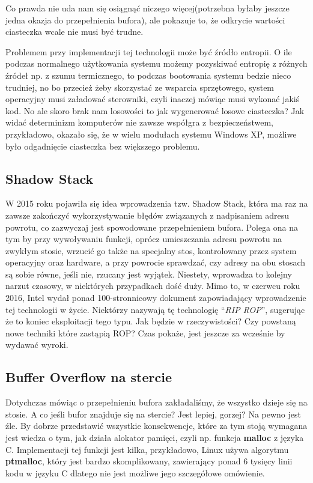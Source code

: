 \documentclass[polish]{kbk}
\begin{document}
Co prawda nie uda nam się osiągnąć niczego więcej(potrzebna byłaby jeszcze 
jedna okazja do przepełnienia bufora), ale pokazuje to, że odkrycie wartości 
ciasteczka wcale nie musi być trudne. 
\par
Problemem przy implementacji tej technologii może być źródło entropii. 
O ile podczas normalnego użytkowania systemu możemy pozyskiwać entropię z różnych 
źródeł np. z szumu termicznego, to podczas bootowania systemu bedzie nieco 
trudniej, no bo przecież żeby skorzystać ze wsparcia sprzętowego, system 
operacyjny musi załadować sterowniki, czyli inaczej mówiąc musi wykonać jakiś kod. 
No ale skoro brak nam losowości to jak wygenerować losowe ciasteczka? Jak widać 
determinizm komputerów nie zawsze współgra z bezpieczeństwem, przykładowo, okazało 
się, że w wielu modułach systemu Windows XP, możliwe było odgadnięcie ciasteczka 
bez większego problemu\cite{cookieentropy}.
\subsection{Shadow Stack}
W 2015 roku pojawiła się idea wprowadzenia tzw. Shadow Stack\cite{shadow}, która ma 
raz na zawsze zakończyć wykorzystywanie błędów związanych z nadpisaniem adresu 
powrotu, co zazwyczaj jest spowodowane przepełnieniem bufora. Polega ona na tym 
by przy wywoływaniu funkcji, oprócz umieszczania adresu powrotu na zwykłym stosie,
wrzucić go także na specjalny stos, kontrolowany przez system operacyjny oraz 
hardware, a przy powrocie sprawdzać, czy adresy na obu stosach są sobie równe, 
jeśli nie, rzucany jest wyjątek. Niestety, wprowadza to kolejny narzut czasowy, 
w niektórych przypadkach dość duży. Mimo to, w czerwcu roku 2016, Intel wydał 
ponad 100-stronnicowy dokument zapowiadający wprowadzenie tej technologii w 
życie\cite{shadowintel}. Niektórzy\cite{riprop} nazywają tę technologię 
``\emph{RIP ROP}'', sugerując że to koniec eksploitacji tego typu. Jak 
będzie w rzeczywistości? Czy powstaną nowe techniki które zastąpią ROP? 
Czas pokaże, jest jeszcze za wcześnie by wydawać wyroki.
\subsection{Buffer Overflow na stercie}
Dotychczas mówiąc o przepełnieniu bufora zakładaliśmy, że wszystko dzieje się 
na stosie. A co jeśli  bufor znajduje się na stercie? Jest lepiej, gorzej? 
Na pewno jest źle. By dobrze przedstawić wszystkie konsekwencje, które za tym 
stoją wymagana jest wiedza o tym, jak działa alokator pamięci, czyli np. funkcja
\textbf{malloc} z języka C. Implementacji tej funkcji jest kilka, przykładowo, 
Linux używa algorytmu \textbf{ptmalloc}, który jest bardzo 
skomplikowany\cite{malloc}, zawierający ponad 6 tysięcy linii kodu w języku 
C dlatego nie jest możliwe jego szczegółowe omówienie.
\end{document}
